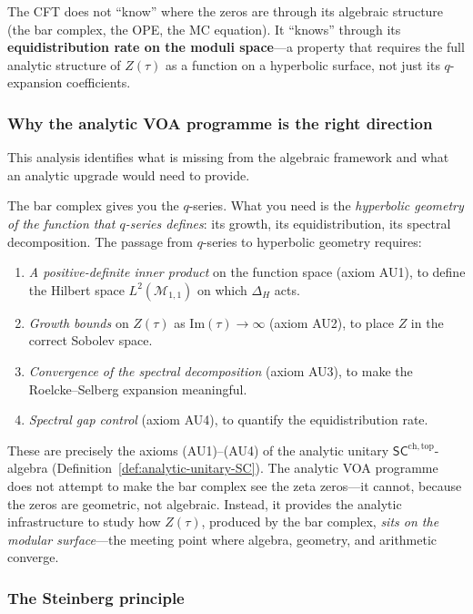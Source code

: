 \documentclass[11pt]{article}
\newcommand{\cM}{\mathcal{M}}
\newcommand{\SCchtop}{\mathsf{SC}^{\mathrm{ch,top}}}
\begin{document}
The CFT does not ``know'' where the zeros are through its
algebraic structure (the bar complex, the OPE, the MC
equation).  It ``knows'' through its
\textbf{equidistribution rate on the moduli space}---a
property that requires the full analytic structure of
$Z(\tau)$ as a function on a hyperbolic surface, not just
its $q$-expansion coefficients.

\subsubsection{Why the analytic VOA programme is the right
  direction}

This analysis identifies what is missing from the algebraic
framework and what an analytic upgrade would need to provide.

The bar complex gives you the $q$-series.  What you need is
the \emph{hyperbolic geometry of the function that
$q$-series defines}: its growth, its equidistribution, its
spectral decomposition.  The passage from $q$-series to
hyperbolic geometry requires:
\begin{enumerate}[label=\textup{(\roman*)}]
\item \emph{A positive-definite inner product} on the
  function space (axiom AU1), to define the Hilbert space
  $L^2(\cM_{1,1})$ on which $\Delta_H$ acts.
\item \emph{Growth bounds} on $Z(\tau)$ as
  $\mathrm{Im}(\tau) \to \infty$ (axiom AU2), to place
  $Z$ in the correct Sobolev space.
\item \emph{Convergence of the spectral decomposition}
  (axiom AU3), to make the Roelcke--Selberg expansion
  meaningful.
\item \emph{Spectral gap control} (axiom AU4), to
  quantify the equidistribution rate.
\end{enumerate}
These are precisely the axioms (AU1)--(AU4) of the analytic
unitary $\SCchtop$-algebra
(Definition~\ref{def:analytic-unitary-SC}).  The analytic
VOA programme does not attempt to make the bar complex see
the zeta zeros---it cannot, because the zeros are geometric,
not algebraic.  Instead, it provides the analytic
infrastructure to study how $Z(\tau)$, produced by the bar
complex, \emph{sits on the modular surface}---the
meeting point where algebra, geometry, and arithmetic
converge.

\subsubsection{The Steinberg principle}
\end{document}
